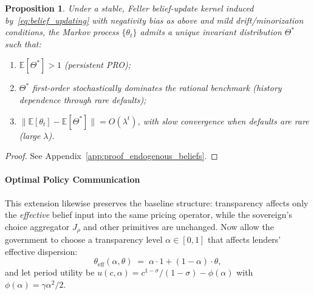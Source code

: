 \documentclass[12pt]{article}
\theoremstyle{plain}
\newtheorem{proposition}{Proposition}
\newcommand{\E}{\mathbb{E}}
\begin{document}
\begin{proposition}\label{prop:endogenous_beliefs}
	Under a stable, Feller belief-update kernel induced by~\eqref{eq:belief_updating} with negativity bias as above and mild drift/minorization conditions, the Markov process $\{\theta_t\}$ admits a unique invariant distribution $\Theta^*$ such that:
	\begin{enumerate}
		\item[\textbf{(i)}] $\E[\Theta^*]>1$ (persistent PRO);
		\item[\textbf{(ii)}] $\Theta^*$ first-order stochastically dominates the rational benchmark (history dependence through rare defaults);
		\item[\textbf{(iii)}] $\|\E[\theta_t]-\E[\Theta^*]\|=O(\lambda^t)$, with slow convergence when defaults are rare (large $\lambda$).
	\end{enumerate}
\end{proposition}

\begin{proof}
	See Appendix~\ref{app:proof_endogenous_beliefs}.
\end{proof}

\paragraph{Optimal Policy Communication}
This extension likewise preserves the baseline structure: transparency affects
only the \emph{effective} belief input into the same pricing operator, while
the sovereign's choice aggregator $J_\rho$ and other primitives are unchanged.
Now allow the government to choose a transparency level $\alpha\in[0,1]$ that
affects lenders' effective dispersion:
\begin{equation}
	\theta_{\mathrm{eff}}(\alpha,\theta)\;=\;\alpha\cdot 1 + (1-\alpha)\cdot \theta,
	\label{eq:effective_theta}
\end{equation}
and let period utility be $u(c,\alpha)=c^{1-\sigma}/(1-\sigma)-\phi(\alpha)$ with $\phi(\alpha)=\gamma\alpha^2/2$.
\end{document}
